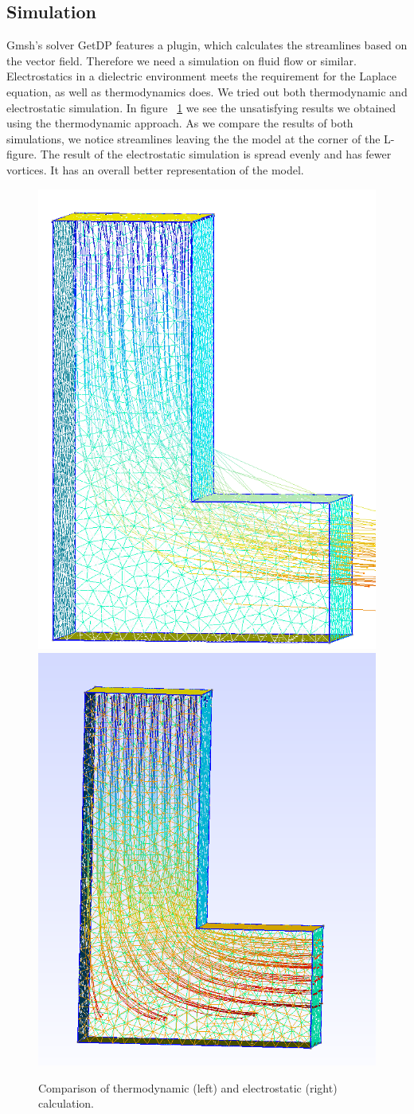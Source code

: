 \documentclass[preprint,journal]{vgtc}       %
\begin{document}
\subsection{Simulation}
Gmsh's solver GetDP features a plugin, which calculates the streamlines based on the vector field. 
Therefore we need a simulation on fluid flow or similar. 
Electrostatics in a dielectric environment meets the requirement for the Laplace equation, as well as thermodynamics does.
We tried out both thermodynamic and electrostatic simulation. 
In figure ~\ref{fig:L} we see the unsatisfying results we obtained using the thermodynamic approach. 
As we compare the results of both simulations, we notice streamlines leaving the the model at the corner of the L-figure. 
The result of the electrostatic simulation is spread evenly and has fewer vortices. 
It has an overall better representation of the model.

\begin{figure}
	
	\begin{minipage}{\linewidth}
		\includegraphics[width=.5\linewidth]{L.PNG} 
		\includegraphics[width=.53\linewidth]{L-ele.png}
		\caption{Comparison of thermodynamic (left) and electrostatic (right) calculation.}
		\label{fig:L}
	\end{minipage}
\end{figure}
\end{document}
